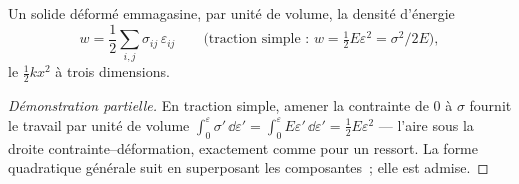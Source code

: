 \begin{proposition}\label{prop:b3:continuum-elasticity:energy}
Un solide déformé emmagasine, par unité de volume, la densité d'énergie
\[
w = \frac12\sum_{i,j}\sigma_{ij}\,\varepsilon_{ij}
\qquad\text{(traction simple~: } w = \tfrac12 E\varepsilon^2 =
\sigma^2/2E\text{)} ,
\]
le $\tfrac12 kx^2$ à trois dimensions.
\end{proposition}

\begin{proof}[Démonstration partielle]
En traction simple, amener la contrainte de $0$ à $\sigma$ fournit le
travail par unité de volume $\int_0^\varepsilon\sigma'\,\dd\varepsilon' =
\int_0^\varepsilon E\varepsilon'\,\dd\varepsilon' = \tfrac12
E\varepsilon^2$ --- l'aire sous la droite contrainte--déformation,
exactement comme pour un ressort. La forme quadratique générale suit en
superposant les composantes~; elle est admise.
\end{proof}


